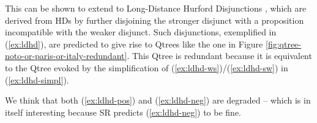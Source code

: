 	This can be shown to extend to Long-Distance Hurford Disjunctions \cite{Marty2022}, which are derived from HDs by further disjoining the stronger disjunct with a proposition incompatible with the weaker disjunct. Such disjunctions, exemplified in (\ref{ex:ldhd}), are predicted to give rise to Qtrees like the one in Figure \ref{fig:qtree-noto-or-paris-or-italy-redundant}. This Qtree is redundant because it is equivalent to the Qtree evoked by the simplification of (\ref{ex:ldhd-ws})/(\ref{ex:ldhd-sw}) in (\ref{ex:ldhd-simpl}).
	
	\begin{exe}
		\ex \label{ex:ldhd}
		\begin{xlist}
			\label{ex:ldhd-ws}
			\label{ex:ldhd-sw}
		\end{xlist}
		\label{ex:ldhd-simpl}
	\end{exe}
	
\begin{exe}
	\ex \label{ex:ldhd}
	\begin{xlist}
		\label{ex:ldhd-pos}
		\label{ex:ldhd-neg}
	\end{xlist}
\end{exe}

We think that both (\ref{ex:ldhd-pos}) and (\ref{ex:ldhd-neg}) are degraded -- which is in itself interesting because SR predicts (\ref{ex:ldhd-neg}) to be fine.




